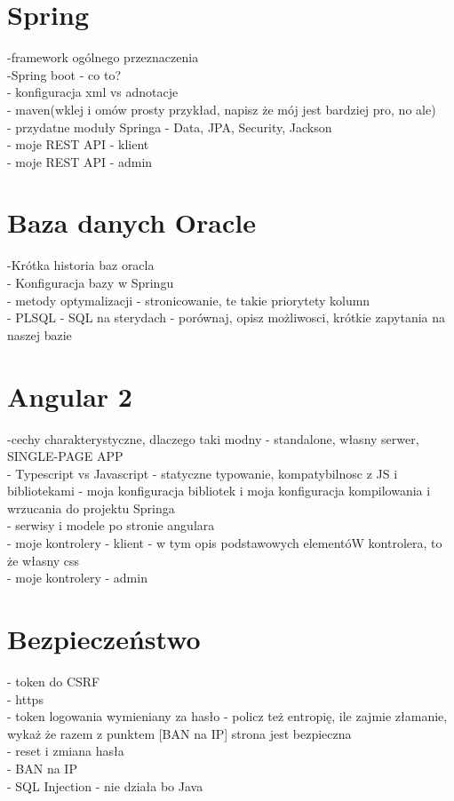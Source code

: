 \documentclass[a4paper,12pt,twoside,openany]{report}
\begin{document}
\chapter{Spring}
-framework ogólnego przeznaczenia\\
-Spring boot - co to?\\
- konfiguracja xml vs adnotacje\\
- maven(wklej i omów prosty przykład, napisz że mój jest bardziej pro, no ale)\\
- przydatne moduły Springa - Data, JPA, Security, Jackson\\
- moje REST API - klient\\
- moje REST API - admin\\

\chapter{Baza danych Oracle}
-Krótka historia baz oracla \\
- Konfiguracja bazy w Springu\\
- metody optymalizacji - stronicowanie, te takie priorytety kolumn\\
- PLSQL - SQL na sterydach - porównaj, opisz możliwosci, krótkie zapytania na naszej bazie\\

\chapter{Angular 2}
-cechy charakterystyczne, dlaczego taki modny - standalone, własny serwer, SINGLE-PAGE APP\\
- Typescript vs Javascript - statyczne typowanie, kompatybilnosc z JS i bibliotekami - moja konfiguracja bibliotek i moja konfiguracja kompilowania i wrzucania do projektu Springa\\
- serwisy i modele po stronie angulara\\
- moje kontrolery - klient - w tym opis podstawowych elementóW kontrolera, to że własny css\\
- moje kontrolery - admin\\

\chapter{Bezpieczeństwo}
- token do CSRF\\
- https\\
- token logowania wymieniany za hasło - policz też entropię, ile zajmie złamanie, wykaż że razem z punktem [BAN na IP] strona jest bezpieczna\\
- reset i zmiana hasła\\
- BAN na IP\\
- SQL Injection - nie działa bo Java\\
\end{document}
